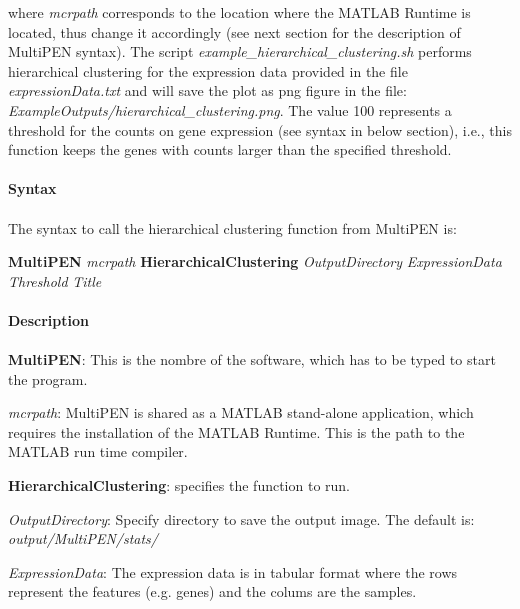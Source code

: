 \documentclass[11pt, oneside]{article}   	%
\begin{document}
\noindent where {\it mcrpath} corresponds to the location where the MATLAB Runtime is located, thus change it accordingly (see next section for the description of MultiPEN syntax). The script {\it example\_hierarchical\_clustering.sh} performs hierarchical clustering for the expression data provided in the file {\it expressionData.txt} and will save the plot as png figure in the file: {\it ExampleOutputs/hierarchical\_clustering.png}. The value 100 represents a threshold for the counts on gene expression (see syntax in below section), i.e., this function keeps the genes with counts larger than the specified threshold. 


\paragraph{Syntax}
\paragraph{}

The syntax to call the hierarchical clustering function from MultiPEN is:

\begin{framed}
   {\bf MultiPEN} {\it mcrpath} {\bf HierarchicalClustering} {\it OutputDirectory} 
   {\it ExpressionData} {\it Threshold} {\it Title}
\end{framed}


\paragraph{Description}
\paragraph{}


{\bf MultiPEN}:  This is the nombre of the software, which has to be typed to start the program.

{\it mcrpath}: MultiPEN is shared as a MATLAB stand-alone application, which requires the installation of the MATLAB Runtime. This is the path to the MATLAB run time compiler.

{\bf HierarchicalClustering}: specifies the function to run.

{\it OutputDirectory}:  Specify directory to save the output image. The default is: {\it output/MultiPEN/stats/} 

{\it ExpressionData}: The expression data is in tabular format where the rows represent the features (e.g. genes) and the colums are the samples. 
\end{document}
